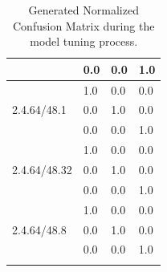 \documentclass[12pt]{article}
\begin{document}
\begin{longtable}{llll}
                                                                            &  0.0 & 0.0 & 1.0 \\ \hline
\multirow{3}{*}{2.4.64/48.1}   &  1.0 & 0.0 & 0.0 \\
                                                                            &  0.0 & 1.0 & 0.0 \\
                                                                            &  0.0 & 0.0 & 1.0 \\ \hline
\multirow{3}{*}{2.4.64/48.32}   &  1.0 & 0.0 & 0.0 \\
                                                                            &  0.0 & 1.0 & 0.0 \\
                                                                            &  0.0 & 0.0 & 1.0 \\ \hline
\multirow{3}{*}{2.4.64/48.8}   &  1.0 & 0.0 & 0.0 \\
                                                                            &  0.0 & 1.0 & 0.0 \\
                                                                            &  0.0 & 0.0 & 1.0 \\ 
\caption{Generated Normalized Confusion Matrix during the model tuning process.}
\label{tab:normed-cmatrix}
\end{longtable}
\end{document}

